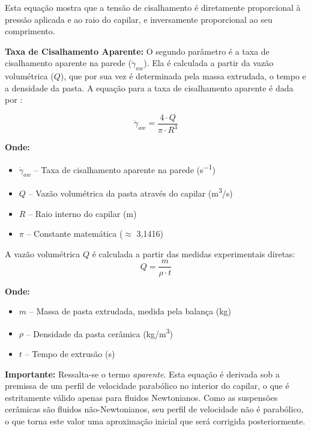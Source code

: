 \documentclass[a4paper,12pt]{article}
\begin{document}
Esta equação mostra que a tensão de cisalhamento é diretamente proporcional à pressão aplicada e ao raio do capilar, e inversamente proporcional ao seu comprimento.

\vspace{1em}
\textbf{Taxa de Cisalhamento Aparente:} O segundo parâmetro é a taxa de cisalhamento aparente na parede ($\dot{\gamma}_{aw}$). Ela é calculada a partir da vazão volumétrica ($Q$), que por sua vez é determinada pela massa extrudada, o tempo e a densidade da pasta. A equação para a taxa de cisalhamento aparente é dada por \cite{reed1995}:

\begin{equation}
    \dot{\gamma}_{aw} = \frac{4 \cdot Q}{\pi \cdot R^3}
\end{equation}

\textbf{Onde:}
\begin{itemize}[leftmargin=1.5em]
  \item $\dot{\gamma}_{aw}$ -- Taxa de cisalhamento aparente na parede (\si{s^{-1}})
  \item $Q$ -- Vazão volumétrica da pasta através do capilar (\si{m^3/s})
  \item $R$ -- Raio interno do capilar (\si{m})
  \item $\pi$ -- Constante matemática ($\approx$ 3,1416)
\end{itemize}

A vazão volumétrica $Q$ é calculada a partir das medidas experimentais diretas:
\begin{equation}
    Q = \frac{m}{\rho \cdot t}
\end{equation}

\textbf{Onde:}
\begin{itemize}[leftmargin=1.5em]
  \item $m$ -- Massa de pasta extrudada, medida pela balança (\si{kg})
  \item $\rho$ -- Densidade da pasta cerâmica (\si{kg/m^3})
  \item $t$ -- Tempo de extrusão (\si{s})
\end{itemize}

\textbf{Importante:} Ressalta-se o termo \textit{aparente}. Esta equação é derivada sob a premissa de um perfil de velocidade parabólico no interior do capilar, o que é estritamente válido apenas para fluidos Newtonianos. Como as suspensões cerâmicas são fluidos não-Newtonianos, seu perfil de velocidade não é parabólico, o que torna este valor uma aproximação inicial que será corrigida posteriormente.
\end{document}
